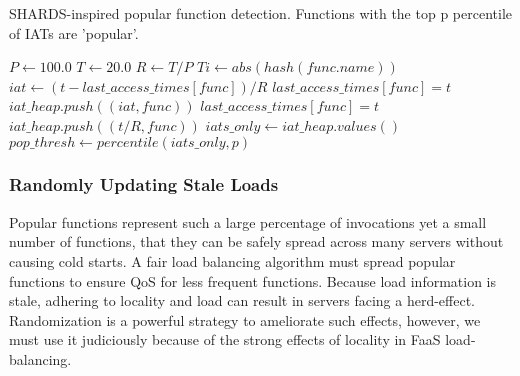 
\begin{algorithm}
\caption{SHARDS-inspired popular function detection. Functions with the top p percentile of IATs are 'popular'.}
\begin{algorithmic}[1]

 \State $P \gets 100.0$
 \State $T \gets 20.0$ 
 \State $R \gets T / P$ 
 \State $Ti \gets abs(hash(func.name))$ 
  \State $iat \gets (t-last\_access\_times[func])/R$
  \State $last\_access\_times[func] = t$ 
  \State $iat\_heap.push((iat, func))$
  \Else
  \State $last\_access\_times[func] = t$
  \State $iat\_heap.push((t/R, func))$
  \EndIf
 \EndIf
 \State $iats\_only \gets iat\_heap.values()$
 \State $pop\_thresh \gets percentile(iats\_only, p)$
\EndProcedure
\end{algorithmic}
\label{algo:shards-popular}
\end{algorithm}

\subsubsection{Randomly Updating Stale Loads}

Popular functions represent such a large percentage of invocations yet a small number of functions, that they can be safely spread across many servers without causing cold starts.
A fair load balancing algorithm must spread popular functions to ensure QoS for less frequent functions. 
Because load information is stale, adhering to locality and load can result in servers facing a herd-effect.
Randomization is a powerful strategy to ameliorate such effects, however, we must use it judiciously because of the strong effects of locality in FaaS load-balancing.


